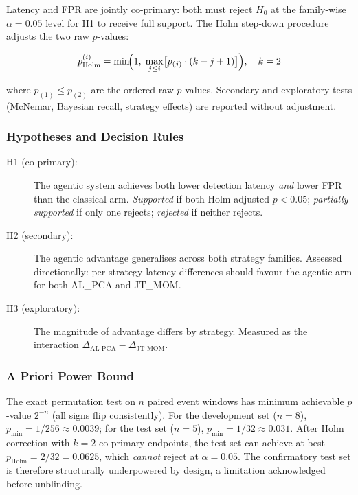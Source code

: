 \documentclass[11pt,a4paper]{article}
\begin{document}
  Latency and FPR are jointly co-primary: both must reject $H_0$ at the
  family-wise $\alpha = 0.05$ level for H1 to receive full support. The Holm
  step-down procedure adjusts the two raw $p$-values:

  \[
    p_\text{Holm}^{(i)} = \min\!\Bigl(1,\;\max_{j \leq i}\bigl[p_{(j)} \cdot (k - j + 1)\bigr]\Bigr),
    \quad k = 2
  \]

  \noindent where $p_{(1)} \leq p_{(2)}$ are the ordered raw $p$-values.
  Secondary and exploratory tests (McNemar, Bayesian recall, strategy effects)
  are reported without adjustment.

  \subsubsection{Hypotheses and Decision Rules}\label{sec:decision-rules}

  \begin{description}
    \item[H1 (co-primary):] The agentic system achieves both lower detection
          latency \emph{and} lower FPR than the classical arm.
          \emph{Supported} if both Holm-adjusted $p < 0.05$;
          \emph{partially supported} if only one rejects;
          \emph{rejected} if neither rejects.
    \item[H2 (secondary):] The agentic advantage generalises across both
          strategy families. Assessed directionally: per-strategy latency
          differences should favour the agentic arm for both AL\_PCA and
          JT\_MOM.
    \item[H3 (exploratory):] The magnitude of advantage differs by strategy.
          Measured as the interaction
          $\Delta_\text{AL\_PCA} - \Delta_\text{JT\_MOM}$.
  \end{description}

  \subsubsection{A Priori Power Bound}

  The exact permutation test on $n$ paired event windows has minimum achievable
  $p$-value $2^{-n}$ (all signs flip consistently). For the development set
  ($n = 8$), $p_\text{min} = 1/256 \approx 0.0039$; for the test set ($n = 5$),
  $p_\text{min} = 1/32 \approx 0.031$. After Holm correction with $k = 2$
  co-primary endpoints, the test set can achieve at best
  $p_\text{Holm} = 2/32 = 0.0625$, which \emph{cannot} reject at $\alpha =
  0.05$. The confirmatory test set is therefore structurally underpowered by
  design, a limitation acknowledged before unblinding.
\end{document}
